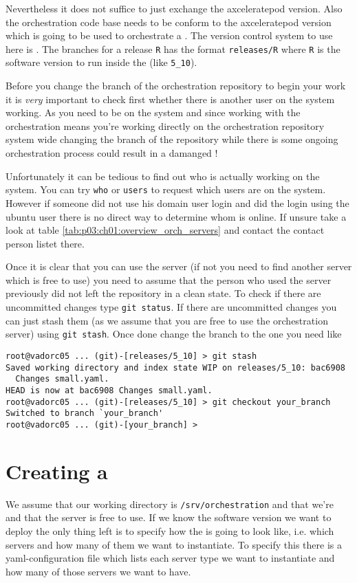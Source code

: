 	Nevertheless it does not suffice to just exchange the axceleratepod version. Also the orchestration code base needs to be conform to the axceleratepod version which is going to be used to orchestrate a \pod{}. The version control system to use here is \git{}. The branches for a release \texttt{R} has the format \texttt{releases/R} where \texttt{R} is the software version to run inside the \pod{} (like \texttt{5_10}).
	
	Before you change the branch of the orchestration repository to begin your work it is \emph{very} important to check first whether there is another user on the system working. As you need to be \rootuser{} on the system and since working with the orchestration means you're working directly on the orchestration repository system wide changing the branch of the repository while there is some ongoing orchestration process could result in a damanged \pod{}!
	
	Unfortunately it can be tedious to find out who is actually working on the system. You can try \texttt{who} or \texttt{users} to request which users are on the system. However if someone did not use his domain user login and did the login using the ubuntu user there is no direct way to determine whom is online. If unsure take a look at table  \ref{tab:p03:ch01:overview_orch_servers} and contact the contact person listet there.
	
	Once it is clear that you can use the server (if not you need to find another server which is free to use) you need to assume that the person who used the server previously did not left the repository in a clean state. To check if there are uncommitted changes type
	\texttt{git status}. If there are uncommitted changes you can just stash them (as we assume that you are free to use the orchestration server) using \texttt{git stash}. Once done change the branch to the one you need like
           \begin{verbatim}
root@vadorc05 ... (git)-[releases/5_10] > git stash
Saved working directory and index state WIP on releases/5_10: bac6908 
  Changes small.yaml.
HEAD is now at bac6908 Changes small.yaml.
root@vadorc05 ... (git)-[releases/5_10] > git checkout your_branch
Switched to branch `your_branch'
root@vadorc05 ... (git)-[your_branch] >
           \end{verbatim}
	
	\section{Creating a \pod{}}
	We assume that our working directory is \texttt{/srv/orchestration} and that we're \rootuser{} and that the server is free to use. If we know the software version we want to deploy the only thing left is to specify how the \pod{} is going to look like, i.e. which servers and how many of them we want to instantiate. To specify this there is a yaml-configuration file which lists each server type we want to instantiate and how many of those servers we want to have.
	
